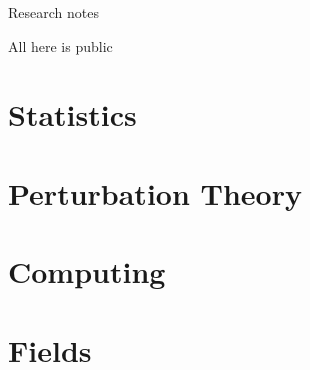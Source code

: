 \documentclass{article}
\theoremstyle{definition}
\theoremstyle{plain} %
\begin{document}
\begin{center}
	\huge{Research notes}
	
	\small{All here is public}
\end{center}

\section{Statistics}


\section{Perturbation Theory}


\section{Computing}


\section{Fields}

\end{document}
